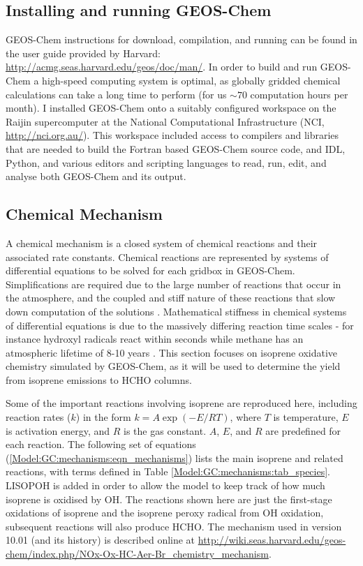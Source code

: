   \subsection{Installing and running GEOS-Chem}
    \label{Model:GC:running}
    GEOS-Chem instructions for download, compilation, and running can be found in the user guide provided by Harvard: \url{http://acmg.seas.harvard.edu/geos/doc/man/}.
    In order to build and run GEOS-Chem a high-speed computing system is optimal, as globally gridded chemical calculations can take a long time to perform (for us $\sim 70$ computation hours per month).
    I installed GEOS-Chem onto a suitably configured workspace on the Raijin supercomputer at the National Computational Infrastructure (NCI, \url{http://nci.org.au/}).
    This workspace included access to compilers and libraries that are needed to build the Fortran based GEOS-Chem source code, and IDL, Python, and various editors and scripting languages to read, run, edit, and analyse both GEOS-Chem and its output.

  \subsection{Chemical Mechanism}
    \label{Model:GC:mechanisms}
    A chemical mechanism is a closed system of chemical reactions and their associated rate constants.
    Chemical reactions are represented by systems of differential equations to be solved for each gridbox in GEOS-Chem.
    Simplifications are required due to the large number of reactions that occur in the atmosphere, and the coupled and stiff nature of these reactions that slow down computation of the solutions \parencite{BrasseurJacob2017}.
    Mathematical stiffness in chemical systems of differential equations is due to the massively differing reaction time scales - for instance hydroxyl radicals react within seconds while methane has an atmospheric lifetime of 8-10 years \parencite{Wuebbles2002}. 
    This section focuses on isoprene oxidative chemistry simulated by GEOS-Chem, as it will be used to determine the yield from isoprene emissions to HCHO columns. 

    Some of the important reactions involving isoprene are reproduced here, including reaction rates ($k$) in the form $ k = A \exp{(-E/RT)}$, where $T$ is temperature, $E$ is activation energy, and $R$ is the gas constant.
    $A$, $E$, and $R$ are predefined for each reaction.
    The following set of equations (\ref{Model:GC:mechanisms:eqn_mechanisms}) lists the main isoprene and related reactions, with terms defined in Table \ref{Model:GC:mechanisms:tab_species}.
    LISOPOH is added in order to allow the model to keep track of how much isoprene is oxidised by OH.
    The reactions shown here are just the first-stage oxidations of isoprene and the isoprene peroxy radical from OH oxidation, subsequent reactions will also produce HCHO.
    The mechanism used in version 10.01 (and its history) is described online at \url{http://wiki.seas.harvard.edu/geos-chem/index.php/NOx-Ox-HC-Aer-Br_chemistry_mechanism}.
    
